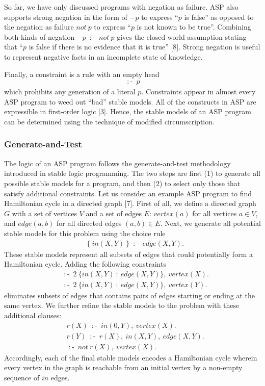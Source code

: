 So far, we have only discussed programs with negation as failure. ASP also supports 
strong negation in the form of $-p$ to express ``$p$ is false'' as opposed to 
the negation as failure $not \: p$ to express ``$p$ is not known to be true''. Combining 
both kinds of negation $-p \: \mathop{:\!\!-} \: not \: p$ gives the closed world assumption 
stating that ``$p$ is false if there is no evidence that it is true'' [8]. Strong negation 
is useful to represent negative facts in an incomplete state of knowledge.

Finally, a constraint is a rule with an empty head 
\begin{align*}
    \mathop{:\!\!-} \: p
\end{align*}
which prohibits 
any generation of a literal $p$. Constraints appear in almost every ASP program to weed out 
``bad'' stable models. All of the constructs in ASP are expressible in first-order 
logic [3]. Hence, the stable models of an ASP program can be determined using the 
technique of modified circumscription.

\subsubsection{Generate-and-Test}
The logic of an ASP program follows the generate-and-test methodology introduced in 
stable logic programming. The two steps are first (1) to generate all possible stable models 
for a program, and then (2) to select only those that satisfy additional constraints. Let us 
consider an example ASP program to find Hamiltonian cycle in a directed graph [7]. First of all, 
we define a directed graph $G$ with a set of vertices $V$ and a set of edges $E$: 
$vertex(a)$ for all vertices $a \in V$, and $edge(a,b)$ for all directed edges $(a,b) \in E$. Next, 
we generate all potential stable models for this problem using the choice rule 
\begin{align*}
    & \{ \: in(X,Y) \: \} \: \mathop{:\!\!-} \: edge(X,Y). 
\end{align*}
These stable models represent all subsets of edges that could potentially form a Hamiltonian 
cycle. Adding the following constraints 
\begin{align*}
    & \mathop{:\!\!-} \: 2 \: \{in(X,Y) \: : \: edge(X,Y)\}, \: vertex(X). \\
    & \mathop{:\!\!-} \: 2 \: \{in(X,Y) \: : \: edge(X,Y)\}, \: vertex(Y). 
\end{align*}
eliminates subsets of edges that contains pairs of edges starting or ending at the same 
vertex. We further refine the stable models to the problem with these additional clauses: 
\begin{align*}
    & r(X) \: \mathop{:\!\!-} \: in(0,Y), \: vertex(X).\\
    & r(Y) \: \mathop{:\!\!-} \: r(X), \: in(X,Y), \: edge(X,Y). \\ 
    & \mathop{:\!\!-} \: not \: r(X), \: vertex(X).
\end{align*}
Accordingly, each of the final stable models encodes a Hamiltonian cycle wherein every vertex in the graph 
is reachable from an initial 
vertex by a non-empty sequence of $in$ edges.  \\ 

